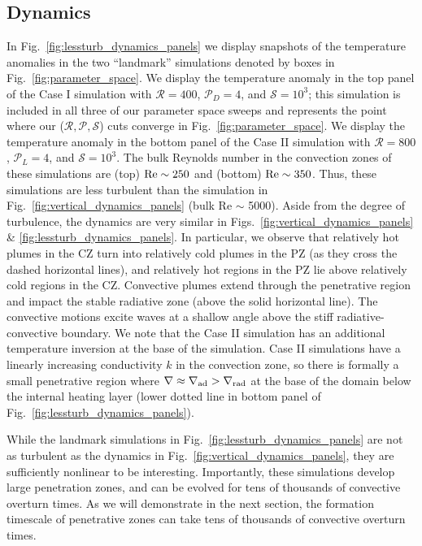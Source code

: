 \documentclass[twocolumn, linenumbers]{aastex631}
\newcommand{\gradrad}{\ensuremath{\nabla_{\rm{rad}}}}
\newcommand{\gradad}{\ensuremath{\nabla_{\rm{ad}}}}
\newcommand{\justgrad}{\ensuremath{\nabla}}
\newcommand{\mP}{\ensuremath{\mathcal{P}}}
\newcommand{\mR}{\ensuremath{\mathcal{R}}}
\newcommand{\mS}{\ensuremath{\mathcal{S}}}
\newcommand{\editone}[1]{#1}
\begin{document}
\subsection{Dynamics}
In Fig.~\ref{fig:lessturb_dynamics_panels} we display snapshots of the temperature anomalies in the two ``landmark'' simulations denoted by boxes in Fig.~\ref{fig:parameter_space}.
We display the temperature anomaly in the top panel of the Case I simulation with $\mR = 400$, $\mP_D = 4$, and $\mS = 10^3$; this simulation is included in all three of our parameter space sweeps and represents the point where our ($\mR, \mP, \mS$) cuts converge  in Fig.~\ref{fig:parameter_space}.
We display the temperature anomaly in the bottom panel of the Case II simulation with $\mR = 800$, $\mP_L = 4$, and $\mS = 10^3$.
The bulk Reynolds number in the convection zones of these simulations are (top) $\rm{Re} \sim 250$ and (bottom) $\rm{Re} \sim 350$.
Thus, these simulations are less turbulent than the simulation in Fig.~\ref{fig:vertical_dynamics_panels} (bulk Re $\sim$ 5000).
Aside from the degree of turbulence, the dynamics are very similar in Figs.~\ref{fig:vertical_dynamics_panels} \& \ref{fig:lessturb_dynamics_panels}.
In particular, we observe that \editone{relatively} hot plumes in the CZ turn into \editone{relatively} cold plumes in the PZ (as they cross the dashed horizontal lines), and \editone{relatively hot regions in the PZ lie above relatively cold regions in the CZ}.
Convective plumes extend through the penetrative region and impact the stable radiative zone (above the solid horizontal line).
The convective motions excite waves at a shallow angle above the stiff radiative-convective boundary.
We note that the Case II simulation has an additional temperature inversion at the base of the simulation.
Case II simulations have a linearly increasing conductivity $k$ in the convection zone, so there is formally a small penetrative region where $\justgrad \approx \gradad > \gradrad$ at the base of the domain below the internal heating layer (lower dotted line in bottom panel of Fig.~\ref{fig:lessturb_dynamics_panels}).

While the landmark simulations in Fig.~\ref{fig:lessturb_dynamics_panels} are not as turbulent as the dynamics in Fig.~\ref{fig:vertical_dynamics_panels}, they are sufficiently nonlinear to be interesting.
Importantly, these simulations develop large penetration zones, and can be evolved for tens of thousands of convective overturn times.
As we will demonstrate in the next section, the formation timescale of penetrative zones can take tens of thousands of convective overturn times.
\end{document}
